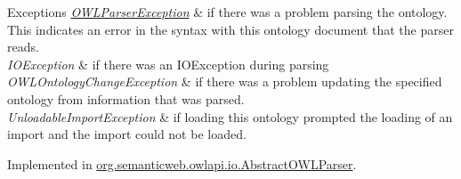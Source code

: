 \begin{DoxyExceptions}{Exceptions}
{\em \hyperlink{classorg_1_1semanticweb_1_1owlapi_1_1io_1_1_o_w_l_parser_exception}{O\-W\-L\-Parser\-Exception}} & if there was a problem parsing the ontology. This indicates an error in the syntax with this ontology document that the parser reads. \\
\hline
{\em I\-O\-Exception} & if there was an I\-O\-Exception during parsing \\
\hline
{\em O\-W\-L\-Ontology\-Change\-Exception} & if there was a problem updating the specified ontology from information that was parsed. \\
\hline
{\em Unloadable\-Import\-Exception} & if loading this ontology prompted the loading of an import and the import could not be loaded. \\
\hline
\end{DoxyExceptions}


Implemented in \hyperlink{classorg_1_1semanticweb_1_1owlapi_1_1io_1_1_abstract_o_w_l_parser_a495633a0b5d6bd211b05254362f1ea93}{org.\-semanticweb.\-owlapi.\-io.\-Abstract\-O\-W\-L\-Parser}.

